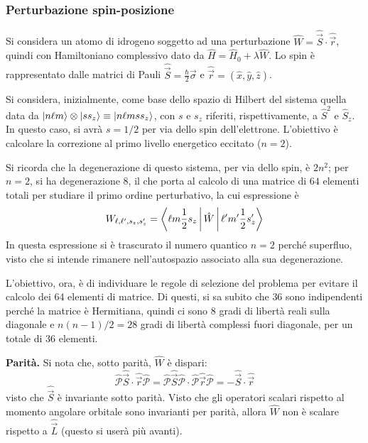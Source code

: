 \documentclass[11pt, a4paper]{scrartcl} %
\numberwithin{equation}{subsection}
\theoremstyle{style2}
\theoremstyle{style1}
\begin{document}
\subsubsection{Perturbazione spin-posizione}
Si considera un atomo di idrogeno soggetto ad una perturbazione $\hat{W} = \hat{\vec{S}}\cdot \hat{\vec{r}}$, quindi con Hamiltoniano complessivo dato da $\hat{H} = \hat{H}_0 + \lambda \hat{W}$.
Lo spin \`e rappresentato dalle matrici di Pauli $\hat{\vec{S}}= \frac{\hbar}{2} \vec{\sigma }$ e $\hat{\vec{r}} = (\hat{x},\hat{y},\hat{z})$.

Si considera, inizialmente, come base dello spazio di Hilbert del sistema quella data da $\ket{n \ell m} \otimes \ket{s s_z} \equiv \ket{n\ell m ss_z} $, con $s$ e $s_z$ riferiti, rispettivamente, a $\hat{S}^2$ e $\hat{S}_z$.
In questo caso, si avr\`a $s = 1 / 2 $ per via dello spin dell'elettrone.
L'obiettivo \`e calcolare la correzione al primo livello energetico eccitato ($n=2$).

Si ricorda che la degenerazione di questo sistema, per via dello spin, \`e $2n^2$; per $n=2$, si ha degenerazione $8$, il che porta al calcolo di una matrice di $64$ elementi totali per studiare il primo ordine perturbativo, la cui espressione \`e
\[
W_{\ell ,\ell ',s_z,s'_z} = \Braket{\ell m \frac{1}{2}s_z|\hat{W}|\ell ' m' \frac{1}{2} s'_z} 
\] 
In questa espressione si \`e trascurato il numero quantico $n=2$ perch\'e superfluo, visto che si intende rimanere nell'autospazio associato alla sua degenerazione.

L'obiettivo, ora, \`e di individuare le regole di selezione del problema per evitare il calcolo dei 64 elementi di matrice. 
Di questi, si sa subito che $36$ sono indipendenti perch\'e la matrice \`e Hermitiana, quindi ci sono $8 $ gradi di libert\`a reali sulla diagonale e $n(n-1) / 2 = 28$ gradi di libert\`a complessi fuori diagonale, per un totale di $36$ elementi.
\vspace{.5cm}

\noindent \textbf{Parit\`a.} Si nota che, sotto parit\`a, $\hat{W}$ \`e dispari:
\[
\hat{\mathcal{P} } \hat{\vec{S}}\cdot \hat{\vec{r}}\hat{\mathcal{P} }= \hat{\mathcal{P} } \hat{\vec{S}}\hat{\mathcal{P} } \cdot \hat{\mathcal{P} }\hat{\vec{r}}\hat{\mathcal{P} }= - \hat{\vec{S}}\cdot \hat{\vec{r}}
\] 
visto che $\hat{\vec{S}}$ \`e invariante sotto parit\`a. 
Visto che gli operatori scalari rispetto al momento angolare orbitale sono invarianti per parit\`a, allora $\hat{W}$ non \`e scalare rispetto a $\hat{\vec{L}}$ (questo si user\`a pi\`u avanti).
\end{document}
